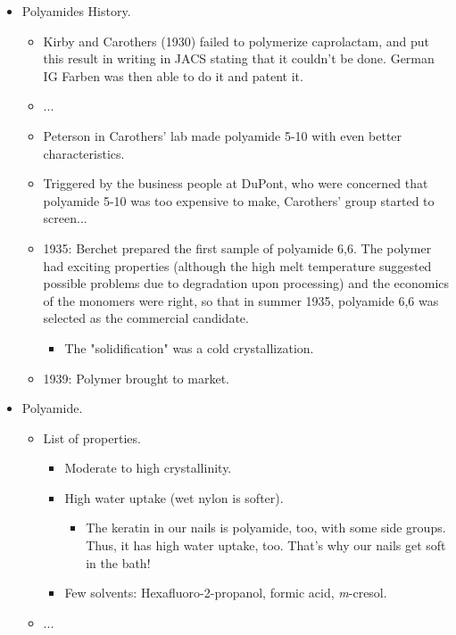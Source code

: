 \documentclass[../notes.tex]{subfiles}
\begin{document}
\begin{itemize}
    \item Polyamides History.
    \begin{itemize}
        \item Kirby and Carothers (1930) failed to polymerize caprolactam, and put this result in writing in JACS stating that it couldn't be done. German IG Farben was then able to do it and patent it.
        \item ...
        \item Peterson in Carothers' lab made polyamide 5-10 with even better characteristics.
        \item Triggered by the business people at DuPont, who were concerned that polyamide 5-10 was too expensive to make, Carothers' group started to screen...
        \item 1935: Berchet prepared the first sample of polyamide 6,6. The polymer had exciting properties (although the high melt temperature suggested possible problems due to degradation upon processing) and the economics of the monomers were right, so that in summer 1935, polyamide 6,6 was selected as the commercial candidate.
        \begin{itemize}
            \item The "solidification" was a cold crystallization.
        \end{itemize}
        \item 1939: Polymer brought to market.
    \end{itemize}
    \item Polyamide.
    \begin{itemize}
        \item List of properties.
        \begin{itemize}
            \item Moderate to high crystallinity.
            \item High water uptake (wet nylon is softer).
            \begin{itemize}
                \item The keratin in our nails is polyamide, too, with some side groups. Thus, it has high water uptake, too. That's why our nails get soft in the bath!
            \end{itemize}
            \item Few solvents: Hexafluoro-2-propanol, formic acid, \emph{m}-cresol.
        \end{itemize}
        \item ...
    \end{itemize}

\end{itemize}
\end{document}
